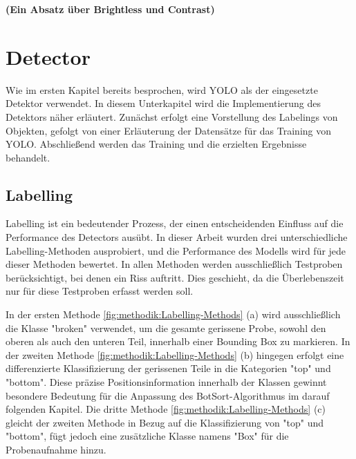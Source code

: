     \textbf{(Ein Absatz über Brightless und Contrast)}
\section{Detector}
Wie im ersten Kapitel bereits besprochen, wird YOLO als der eingesetzte Detektor verwendet. In diesem Unterkapitel wird die Implementierung des Detektors näher erläutert. Zunächst erfolgt eine Vorstellung des Labelings von Objekten, gefolgt von einer Erläuterung der Datensätze für das Training von YOLO. Abschließend werden das Training und die erzielten Ergebnisse behandelt.

    \subsection{Labelling} 
    Labelling ist ein bedeutender Prozess, der einen entscheidenden Einfluss auf die Performance des Detectors ausübt. In dieser Arbeit wurden drei unterschiedliche Labelling-Methoden ausprobiert, und die Performance des Modells wird für jede dieser Methoden bewertet. In allen Methoden werden ausschließlich Testproben berücksichtigt, bei denen ein Riss auftritt. Dies geschieht, da die Überlebenszeit nur für diese Testproben erfasst werden soll. 

    In der ersten Methode \ref{fig:methodik:Labelling-Methods} (a) wird ausschließlich die Klasse "broken" verwendet, um die gesamte gerissene Probe, sowohl den oberen als auch den unteren Teil, innerhalb einer Bounding Box zu markieren. In der zweiten Methode \ref{fig:methodik:Labelling-Methods} (b) hingegen erfolgt eine differenzierte Klassifizierung der gerissenen Teile in die Kategorien "top" und "bottom". Diese präzise Positionsinformation innerhalb der Klassen gewinnt besondere Bedeutung für die Anpassung des BotSort-Algorithmus im darauf folgenden Kapitel. Die dritte Methode \ref{fig:methodik:Labelling-Methods} (c) gleicht der zweiten Methode in Bezug auf die Klassifizierung von "top" und "bottom", fügt jedoch eine zusätzliche Klasse namens "Box" für die Probenaufnahme hinzu.

